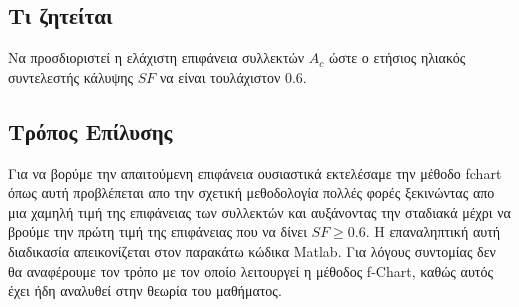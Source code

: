 \documentclass[10pt,a4paper]{article}
\begin{document}
\subsection*{Τι ζητείται}
Να προσδιοριστεί η ελάχιστη επιφάνεια συλλεκτών $A_c$ ώστε ο ετήσιος ηλιακός 
συντελεστής κάλυψης $SF$ να είναι τουλάχιστον 0.6.

\subsection*{Τρόπος Επίλυσης}
Για να βορύμε την απαιτούμενη επιφάνεια ουσιαστικά εκτελέσαμε την μέθοδο fchart όπως αυτή προβλέπεται 
απο την σχετική μεθοδολογία πολλές φορές ξεκινώντας απο μια χαμηλή τιμή της επιφάνειας των συλλεκτών
και αυξάνοντας την σταδιακά μέχρι να βρούμε την πρώτη τιμή της επιφάνειας που να δίνει $SF \geq 0.6$.
Η επαναληπτική αυτή διαδικασία απεικονίζεται στον παρακάτω κώδικα Matlab. Για λόγους συντομίας δεν θα αναφέρουμε 
τον τρόπο με τον οποίο λειτουργεί η μέθοδος f-Chart, καθώς αυτός έχει ήδη αναλυθεί στην θεωρία του μαθήματος.
\end{document}
